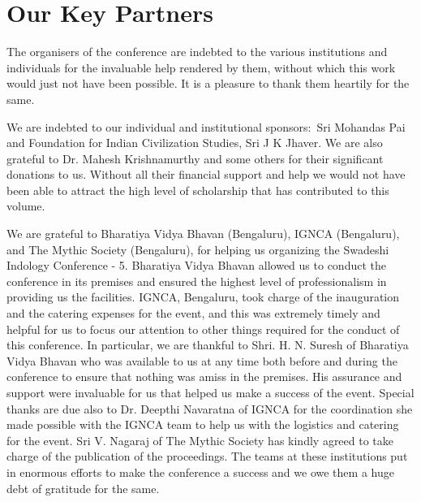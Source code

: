 
\chapter*{Our Key Partners}\label{keypartners}

\vspace{-.5cm}

The organisers of the conference are indebted to the various institutions and individuals for the invaluable help rendered by them, without which this work would just not have been possible. It is a pleasure to thank them heartily for the same.

We are indebted to our individual and institutional sponsors:~Sri Mohandas Pai and Foundation for Indian Civilization Studies, Sri J K Jhaver. We are also grateful to Dr. Mahesh Krishnamurthy and some others for their significant donations to us. Without all their financial support and help we would not have been able to attract the high level of scholarship that has contributed to this volume.

We are grateful to Bharatiya Vidya Bhavan (Bengaluru), IGNCA (Bengaluru), and The Mythic Society (Bengaluru), for helping us organizing the Swadeshi Indology Conference - 5. Bharatiya Vidya Bhavan allowed us to conduct the conference in its premises and ensured the highest level of professionalism in providing us the facilities. IGNCA, Bengaluru, took charge of the inauguration and the catering expenses for the event, and this was extremely timely and helpful for us to focus our attention to other things required for the conduct of this conference. In particular, we are thankful to Shri. H. N. Suresh of Bharatiya Vidya Bhavan who was available to us at any time both before and during the conference to ensure that nothing was amiss in the premises. His assurance and support were invaluable for us that helped us make a success of the event. Special thanks are due also to Dr. Deepthi Navaratna of IGNCA for the coordination she made possible with the IGNCA team to help us with the logistics and catering for the event. Sri V. Nagaraj of The Mythic Society has kindly agreed to take charge of the publication of the proceedings. The teams at these institutions put in enormous efforts to make the conference a success and we owe them a huge debt of gratitude for the same. 

\newpage
